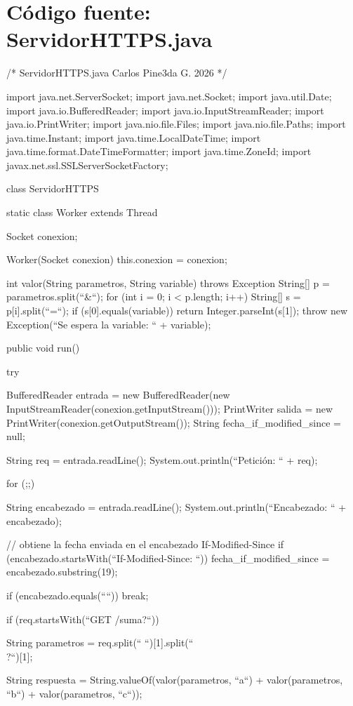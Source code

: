 \chapter{Código fuente: ServidorHTTPS.java}
\begin{SourceCode}
/*
  ServidorHTTPS.java
  Carlos Pine3da G. 2026
*/

import java.net.ServerSocket;
import java.net.Socket;
import java.util.Date;
import java.io.BufferedReader;
import java.io.InputStreamReader;
import java.io.PrintWriter;
import java.nio.file.Files;
import java.nio.file.Paths;
import java.time.Instant;
import java.time.LocalDateTime;
import java.time.format.DateTimeFormatter;
import java.time.ZoneId;
import javax.net.ssl.SSLServerSocketFactory;

class ServidorHTTPS
{
  static class Worker extends Thread
  {
    Socket conexion;

    Worker(Socket conexion)
    {
      this.conexion = conexion;
    }

    int valor(String parametros, String variable) throws Exception
    {
      String[] p = parametros.split(``&``);
      for (int i = 0; i < p.length; i++)
      {
        String[] s = p[i].split(``=``);
        if (s[0].equals(variable))
          return Integer.parseInt(s[1]);
      }
      throw new Exception(``Se espera la variable: `` + variable);
    }

    public void run()
    {
      try
      {
        BufferedReader entrada = new BufferedReader(new InputStreamReader(conexion.getInputStream()));
        PrintWriter salida = new PrintWriter(conexion.getOutputStream());
        String fecha_if_modified_since = null;

        String req = entrada.readLine();
        System.out.println(``Petición: `` + req);

        for (;;)
        {
          String encabezado = entrada.readLine();
          System.out.println(``Encabezado: `` + encabezado);

          // obtiene la fecha enviada en el encabezado If-Modified-Since
          if (encabezado.startsWith(``If-Modified-Since: ``))
	          fecha_if_modified_since = encabezado.substring(19);

          if (encabezado.equals(````)) break;
        }

        if (req.startsWith(``GET /suma?``))
        {
          String parametros = req.split(`` ``)[1].split(``\\?``)[1];

          String respuesta = String.valueOf(valor(parametros, ``a``) + valor(parametros, ``b``) + valor(parametros, ``c``));

}}}}}
\end{SourceCode}
